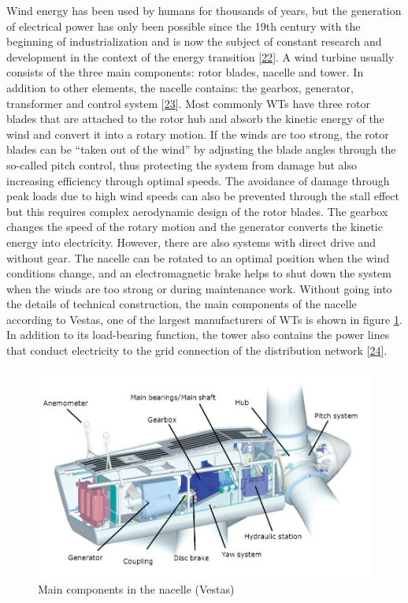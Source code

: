 \documentclass[a4paper,11pt]{article}
\begin{document}
Wind energy has been used by humans for thousands of years, but the generation of electrical power has only been possible since the 19th century with the beginning of industrialization and is now the subject of constant research and development in the context of the energy transition {[}\protect\hyperlink{ref-Wikipedia.2021}{22}{]}. A wind turbine usually consists of the three main components: rotor blades, nacelle and tower. In addition to other elements, the nacelle contains: the gearbox, generator, transformer and control system {[}\protect\hyperlink{ref-MladenBosnjakovic.2013}{23}{]}. Most commonly WTs have three rotor blades that are attached to the rotor hub and absorb the kinetic energy of the wind and convert it into a rotary motion. If the winds are too strong, the rotor blades can be ``taken out of the wind'' by adjusting the blade angles through the so-called pitch control, thus protecting the system from damage but also increasing efficiency through optimal speeds. The avoidance of damage through peak loads due to high wind speeds can also be prevented through the stall effect but this requires complex aerodynamic design of the rotor blades. The gearbox changes the speed of the rotary motion and the generator converts the kinetic energy into electricity. However, there are also systems with direct drive and without gear. The nacelle can be rotated to an optimal position when the wind conditions change, and an electromagnetic brake helps to shut down the system when the winds are too strong or during maintenance work. Without going into the details of technical construction, the main components of the nacelle according to Vestas, one of the largest manufacturers of WTs is shown in figure \ref{fig:nacelle}. In addition to its load-bearing function, the tower also contains the power lines that conduct electricity to the grid connection of the distribution network {[}\protect\hyperlink{ref-NetzKonstrukteur.16.11.2020}{24}{]}.
\begin{figure}[H]

{\centering \includegraphics[width=0.9\linewidth]{figures/nacelle} 

}

\caption{Main components in the nacelle (Vestas)}\label{fig:nacelle}
\end{figure}
\end{document}
